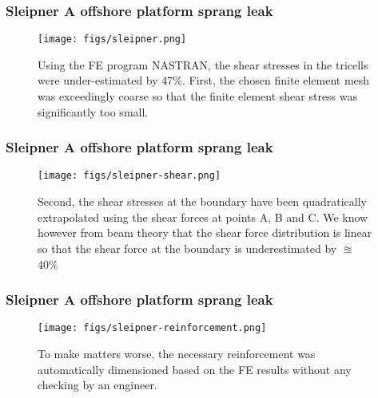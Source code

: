 \documentclass[notes]{beamer}
\begin{document}
\begin{frame}
\frametitle{Sleipner A offshore platform sprang leak}
\begin{figure}
	\centering
	\texttt{[image: figs/sleipner.png]}
	\caption*{Using the FE program NASTRAN, the shear stresses in the tricells were under-estimated by 47\%. First, the chosen finite element mesh was exceedingly coarse so that the finite element shear stress was significantly too small.}
\end{figure}
\end{frame}

\begin{frame}
\frametitle{Sleipner A offshore platform sprang leak}
\begin{figure}
	\centering
	\texttt{[image: figs/sleipner-shear.png]}
	\caption*{Second, the shear stresses at the boundary have been quadratically extrapolated using the shear forces at points A, B and C. We know however from beam theory that the shear force distribution is linear so that the shear force at the boundary is underestimated by $\approxeq$ 40\%}
\end{figure}
\end{frame}

\begin{frame}
\frametitle{Sleipner A offshore platform sprang leak}
\begin{figure}
	\centering
	\texttt{[image: figs/sleipner-reinforcement.png]}
	\caption*{To make matters worse, the necessary reinforcement was automatically 
		dimensioned based on the FE results without any checking by an engineer.}
\end{figure}
\end{frame}
\end{document}
